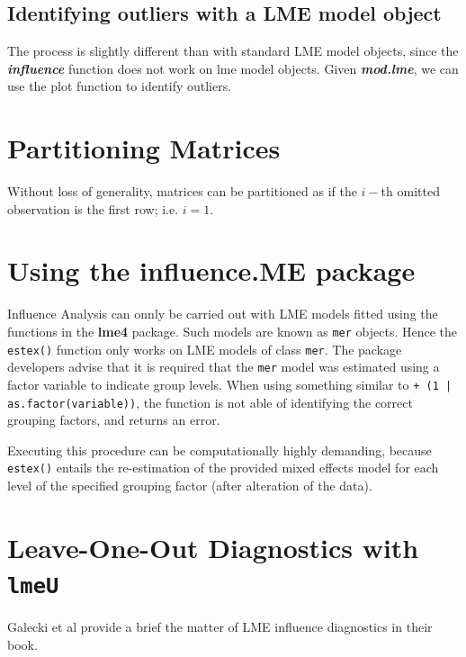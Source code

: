 \documentclass[12pt, a4paper]{report}
\begin{document}









\subsection{Identifying outliers with a LME model object}

The process is slightly different than with standard LME model objects, since the \textbf{\emph{influence}}
function does not work on lme model objects. Given \textbf{\emph{mod.lme}}, we can use the plot function to
identify outliers.


\section{Partitioning Matrices} %
Without loss of generality, matrices can be partitioned as if the $i-$th omitted observation is the first row; i.e. $i=1$.




\section*{Using the influence.ME package}
Influence Analysis can onnly be carried out with LME models fitted using the functions in the \textbf{lme4} package. Such models are known as \texttt{mer} objects.
Hence the \texttt{estex()} function only works on LME
models of class \texttt{mer}.
The package developers advise that it is required that the \texttt{mer} model was estimated using a factor variable to indicate group levels.
When using something similar to \texttt{+ (1 | as.factor(variable))}, the function is not able of
identifying the correct grouping factors, and returns an error.

Executing this procedure can be computationally highly demanding, because \texttt{estex()} entails the re-estimation of the provided mixed effects model for each level of the specified grouping factor (after alteration of the data).

\section{Leave-One-Out Diagnostics with \texttt{lmeU}}
Galecki et al provide a brief the matter of LME influence diagnostics in their book.
\end{document}
